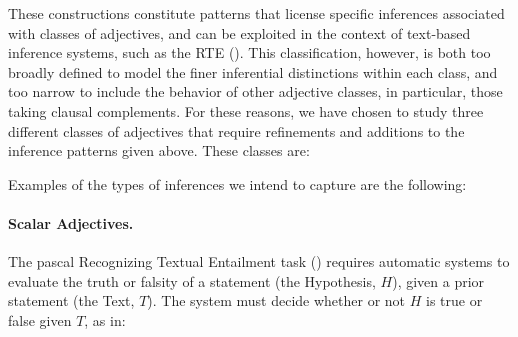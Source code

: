 \documentclass[10pt]{article}
\begin{document}
\noindent These constructions   constitute  patterns that license specific inferences associated with classes of adjectives, and  can be exploited  
 in the context  of text-based inference systems, such as the RTE (\cite{amoia2006adjective}). 
This classification, however, is both too broadly defined to model the finer inferential distinctions  within each class, and too narrow to include the behavior of other adjective classes, in particular, those taking clausal complements. 
For these reasons, we have chosen to study three different classes of adjectives that  require refinements and additions to the inference patterns given above. These classes are:
 \vspace{-.1in}


 \vspace{-.1in}
Examples of the types of inferences we intend to capture are the following:

 \vspace{-.15in}
\paragraph{Scalar Adjectives.} The {\sc pascal} Recognizing Textual Entailment task (\cite{rte,dagan+glickman+magnini:2005}) requires automatic systems to evaluate the truth or falsity of a 
statement (the Hypothesis, $H$), given a prior statement (the Text, $T$). The system must decide whether or not $H$ is true or false given $T$, as in:
 \vspace{-.1in}
\end{document}
